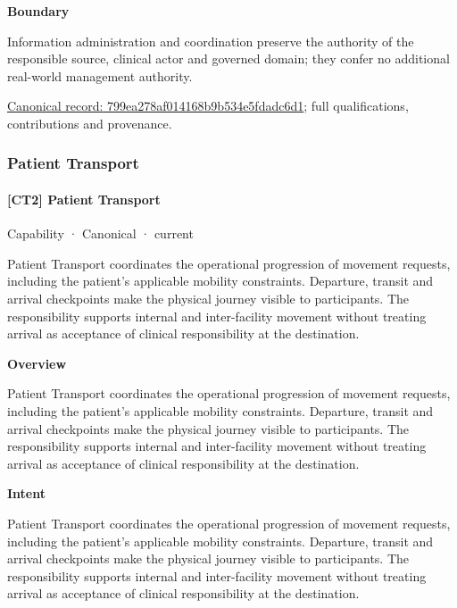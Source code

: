 \textbf{Boundary}



Information administration and coordination preserve the authority of the responsible source, clinical actor and governed domain; they confer no additional real-world management authority.


{\footnotesize \href{../../../../continuum/strategy/capability/799ea278af014168b9b534e5fdadc6d1.md}{Canonical record: 799ea278af014168b9b534e5fdadc6d1}; full qualifications, contributions and provenance.}\par
\subsubsection{Patient Transport}

\paragraph{[CT2] Patient Transport}

\label{element:6041d7c0cc5d4519aaea584bb4e6d365}
{\small Capability · Canonical · current}\par

Patient Transport coordinates the operational progression of movement requests, including the patient's applicable mobility constraints. Departure, transit and arrival checkpoints make the physical journey visible to participants. The responsibility supports internal and inter-facility movement without treating arrival as acceptance of clinical responsibility at the destination.



\textbf{Overview}



Patient Transport coordinates the operational progression of movement requests, including the patient's applicable mobility constraints. Departure, transit and arrival checkpoints make the physical journey visible to participants. The responsibility supports internal and inter-facility movement without treating arrival as acceptance of clinical responsibility at the destination.



\textbf{Intent}



Patient Transport coordinates the operational progression of movement requests, including the patient's applicable mobility constraints. Departure, transit and arrival checkpoints make the physical journey visible to participants. The responsibility supports internal and inter-facility movement without treating arrival as acceptance of clinical responsibility at the destination.



